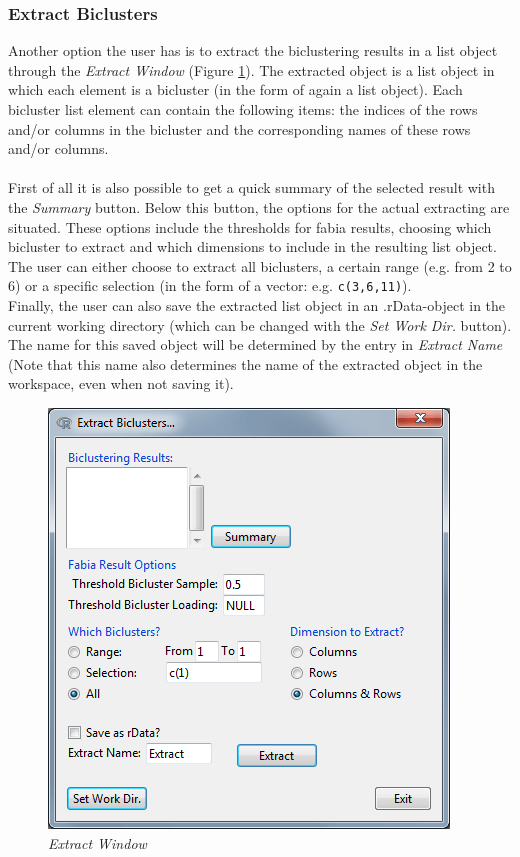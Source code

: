 \documentclass[a4paper]{article}\usepackage[]{graphicx}\usepackage[]{color}
\begin{document}
\subsubsection{Extract Biclusters}
\noindent Another option the user has is to extract the biclustering results in
a list object through the {\it Extract Window} (Figure \ref{extractwindow}). The extracted
object is a list object in which each element is a bicluster (in the form of again a list
object). Each bicluster list element can contain the following items: the
indices of the rows and/or columns in the bicluster and the corresponding names
of these rows and/or columns.
\\ \\
First of all it is also possible to get a quick summary of the selected result
with the {\it Summary} button. Below this button, the options for the actual
extracting are situated. These options include the thresholds for fabia results,
choosing which bicluster to extract and which dimensions to include in the
resulting list object. The user can either choose to extract all biclusters, a
certain range (e.g. from 2 to 6) or a specific selection (in the form of a
vector: e.g. \verb|c(3,6,11)|).\\
Finally, the user can also save the extracted list object in an .rData-object in
the current working directory (which can be changed with the {\it Set Work Dir.}
button). The name for this saved object will be determined by the entry in {\it
Extract Name} (Note that this name also determines the name of the extracted
object in the workspace, even when not saving it).


\begin{figure}[H]
\centering
\includegraphics[scale=0.5]{figures/extractwindow.png}
\caption{{\it Extract Window}\label{extractwindow}}
\end{figure}
\end{document}
